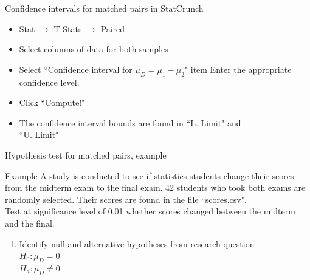 \documentclass[xcolor=table, handout]{beamer}
\begin{document}
\begin{frame}{Confidence intervals for matched pairs in StatCrunch}

\begin{block}{}
\begin{itemize}
\large
\item Stat $\to$ T Stats $\to$ Paired
\item Select columns of data for both samples
\item Select ``Confidence interval for $\mu_D = \mu_1 - \mu_2$"
item Enter the appropriate confidence level.
\item Click ``Compute!"
\item The confidence interval bounds are found in ``L. Limit" and\\ ``U. Limit"
\end{itemize}
\end{block}

\end{frame}

\begin{frame}{Hypothesis test for matched pairs, example}
\large
\begin{exampleblock}{Example}
A study is conducted to see if statistics students change their scores from the midterm exam to the final exam. 42 students who took both exams are randomly selected. Their scores are found in the file ``scores.csv".\\
\medskip
Test at significance level of 0.01 whether scores changed between the midterm and the final.
\begin{enumerate}
\pause\item Identify null and alternative hypotheses from research question\\
\pause$H_0: \mu_D = 0$\\
$H_a: \mu_D \ne 0$\\
\end{enumerate}
\end{exampleblock}
\end{frame}
\end{document}
